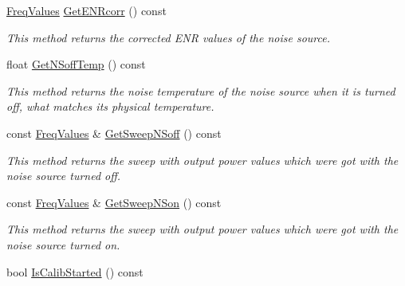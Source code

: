 \begin{DoxyCompactItemize}
\mbox{\label{classFrontEndCalibrator_a066f5c2a3f21c2bc3875b1926048e3be}} 
\hyperlink{structFreqValues}{Freq\+Values} \hyperlink{classFrontEndCalibrator_a066f5c2a3f21c2bc3875b1926048e3be}{Get\+E\+N\+Rcorr} () const
\begin{DoxyCompactList}\small\item\em This method returns the corrected E\+NR values of the noise source. \end{DoxyCompactList}\item 
\mbox{\label{classFrontEndCalibrator_a49a2457f8c8c046e3e9dfcb0ba9047f0}} 
float \hyperlink{classFrontEndCalibrator_a49a2457f8c8c046e3e9dfcb0ba9047f0}{Get\+N\+Soff\+Temp} () const
\begin{DoxyCompactList}\small\item\em This method returns the noise temperature of the noise source when it is turned off, what matches its physical temperature. \end{DoxyCompactList}\item 
\mbox{\label{classFrontEndCalibrator_a59000567e2ba2b8bf5b14e6edee56b5e}} 
const \hyperlink{structFreqValues}{Freq\+Values} \& \hyperlink{classFrontEndCalibrator_a59000567e2ba2b8bf5b14e6edee56b5e}{Get\+Sweep\+N\+Soff} () const
\begin{DoxyCompactList}\small\item\em This method returns the sweep with output power values which were got with the noise source turned off. \end{DoxyCompactList}\item 
\mbox{\label{classFrontEndCalibrator_ae0914096e6cee72ca5ae86543e3615ef}} 
const \hyperlink{structFreqValues}{Freq\+Values} \& \hyperlink{classFrontEndCalibrator_ae0914096e6cee72ca5ae86543e3615ef}{Get\+Sweep\+N\+Son} () const
\begin{DoxyCompactList}\small\item\em This method returns the sweep with output power values which were got with the noise source turned on. \end{DoxyCompactList}\item 
\mbox{\label{classFrontEndCalibrator_a8e3b3555fa5505ed9916fa8f76fee7cb}} 
bool \hyperlink{classFrontEndCalibrator_a8e3b3555fa5505ed9916fa8f76fee7cb}{Is\+Calib\+Started} () const

\end{DoxyCompactItemize}
